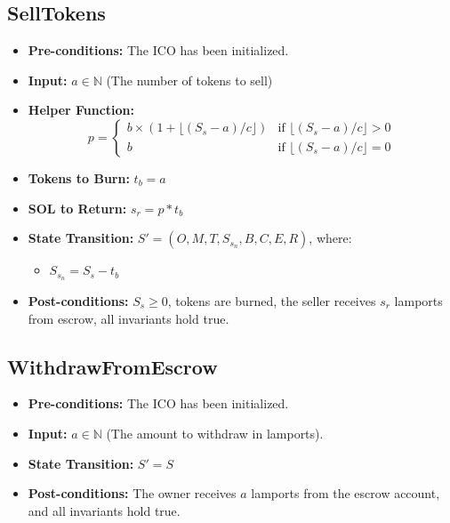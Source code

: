 \documentclass{article}
\begin{document}
\subsection{SellTokens}
\begin{itemize}
    \item \textbf{Pre-conditions:} The ICO has been initialized.
         \item  \textbf{Input:} $a \in \mathbb{N}$ (The number of tokens to sell)
    \item  \textbf{Helper Function:}
    $$
    p =
    \begin{cases}
    b \times (1 + \lfloor (S_s - a) / c \rfloor)
        & \text{if }  \lfloor (S_s - a) / c \rfloor > 0
        \\
         b & \text{if }  \lfloor (S_s - a) / c \rfloor = 0
    \end{cases}
    $$
    \item  \textbf{Tokens to Burn:} $t_b = a$
    \item \textbf{SOL to Return:} $s_r = p * t_b$
    \item \textbf{State Transition:}
            $S' = (O, M, T, S_{s_n}, B, C, E, R)$, where:
            \begin{itemize}
                 \item $S_{s_n} = S_s - t_b $
            \end{itemize}
    \item \textbf{Post-conditions:} $S_s \geq 0$, tokens are burned, the seller receives $s_r$ lamports from escrow, all invariants hold true.
\end{itemize}

\subsection{WithdrawFromEscrow}
\begin{itemize}
   \item \textbf{Pre-conditions:} The ICO has been initialized.
      \item \textbf{Input:}  $a \in \mathbb{N}$ (The amount to withdraw in lamports).
    \item \textbf{State Transition:}
            $S' = S$
    \item \textbf{Post-conditions:} The owner receives $a$ lamports from the escrow account, and all invariants hold true.
\end{itemize}
\end{document}
